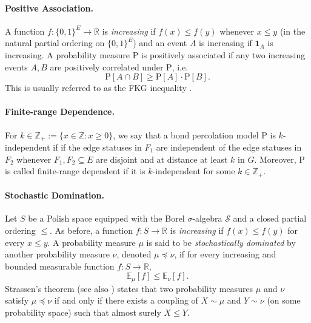 \documentclass[11pt]{article}
\newcommand{\Z}{\mathbb{Z}}
\theoremstyle{remark}
\begin{document}
\paragraph{Positive Association.} A function $f:\{0,1\}^E \to \mathbb R$ is \emph{increasing} if $f(x) \le f(y)$ whenever $x \le y$ (in the natural partial ordering on $\{0,1\}^E$) and an event $A$ is increasing if $\mathbf{1}_A$ is increasing. A probability measure $\mathrm{P}$ is positively associated if any two increasing events $A, B$ are positively correlated under $\mathrm{P}$, i.e.
\begin{equation*}
	\mathrm{P}\left[A \cap B\right] \ge \mathrm{P}\left[A \right] \cdot \mathrm{P}\left[B\right].
\end{equation*}
This is usually referred to as the FKG inequality \cite{fortuin1971correlation}. 

\paragraph{Finite-range Dependence.} 
For $k \in \Z_+ := \{x \in \Z: x \ge 0\}$, we say that a bond percolation model $\mathrm{P}$  is $k$-independent if if the edge statuses in $F_1$ are independent of the edge statuses in $F_2$ whenever $F_1,F_2 \subseteq E$ are disjoint and at distance at least $k$ in $G$. Moreover, $\mathrm{P}$ is called finite-range dependent if it is $k$-independent for some $k \in \Z_+$. 

\paragraph{Stochastic Domination.} Let $S$ be a Polish space equipped with the Borel $\sigma$-algebra $\mathcal S$ and a closed partial ordering $\leq$. As before, a function $f:S \to \mathbb R$ is \emph{increasing} if $f(x) \le f(y)$ for every $x \leq y$.  A probability measure $\mu$ is said to be \emph{stochastically dominated} by another probability measure $\nu$, denoted $\mu \preceq \nu$, if for every increasing and bounded measurable function $f:S \to \mathbb R$, 
\begin{equation}
	\mathbb{E}_\mu[f] \le \mathbb{E}_\nu[f].
\end{equation}
Strassen's theorem \cite{Strassen1965} (see also \cite{Lindvall1999}) states that two probability measures $\mu$ and $\nu$ satisfy $\mu \preceq \nu$ if and only if there exists a coupling of $X \sim \mu$ and $Y \sim \nu$ (on some probability space) such that almost surely $X \le Y$. 
\end{document}
